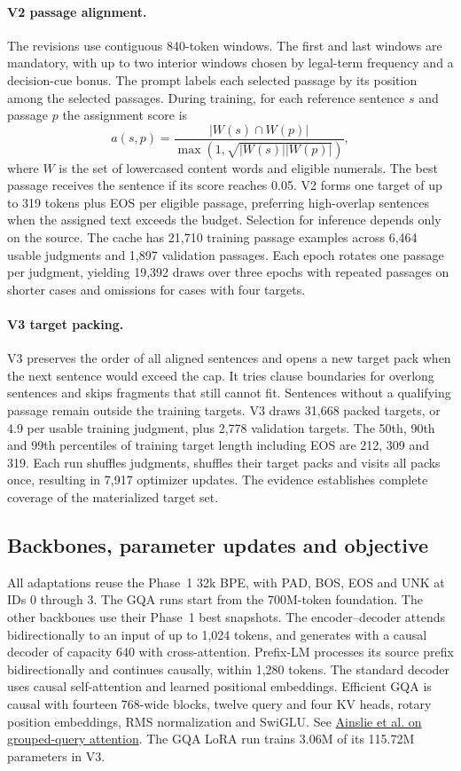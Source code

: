 \paragraph{V2 passage alignment.}
The revisions use contiguous 840-token windows. The first and last windows
are mandatory, with up to two interior windows chosen by legal-term frequency
and a decision-cue bonus. The prompt labels each selected passage by its
position among the selected passages. During training, for each reference
sentence \(s\) and passage \(p\) the assignment score is
\[
 a(s,p)=\frac{|W(s)\cap W(p)|}{\max(1,\sqrt{|W(s)||W(p)|})},
\]
where \(W\) is the set of lowercased content words and eligible numerals.
The best passage receives the sentence if its score reaches 0.05. V2 forms
one target of up to 319 tokens plus EOS per eligible passage, preferring
high-overlap sentences when the assigned text exceeds the budget. Selection
for inference depends only on the source. The cache has 21,710 training
passage examples across 6,464 usable judgments and 1,897 validation passages.
Each epoch rotates one passage per judgment, yielding 19,392 draws over
three epochs with repeated passages on shorter cases and omissions for
cases with four targets.

\paragraph{V3 target packing.}
V3 preserves the order of all aligned sentences and opens a new target pack
when the next sentence would exceed the cap. It tries clause boundaries for
overlong sentences and skips fragments that still cannot fit. Sentences
without a qualifying passage remain outside the training targets. V3 draws
31,668 packed targets, or 4.9 per usable training judgment, plus 2,778
validation targets. The 50th, 90th and 99th percentiles of training target
length including EOS are 212, 309 and 319. Each run shuffles judgments,
shuffles their target packs and visits all packs once, resulting in 7,917
optimizer updates. The evidence establishes complete coverage of the
materialized target set.

\subsection{Backbones, parameter updates and objective}
All adaptations reuse the Phase~1 32k BPE, with PAD, BOS, EOS and UNK at IDs
0 through 3. The GQA runs start from the 700M-token foundation. The other
backbones use their Phase~1 best snapshots. The encoder--decoder attends
bidirectionally to an input of up to 1,024 tokens, and generates with a
causal decoder of capacity 640 with cross-attention. Prefix-LM processes its
source prefix bidirectionally and continues causally, within 1,280 tokens.
The standard decoder uses causal self-attention and learned positional
embeddings. Efficient GQA is causal with fourteen 768-wide blocks, twelve
query and four KV heads, rotary position embeddings, RMS normalization and
SwiGLU. See \href{https://aclanthology.org/2023.emnlp-main.298/}{Ainslie et al. on grouped-query attention}. The GQA LoRA run trains 3.06M of its 115.72M parameters in V3.

